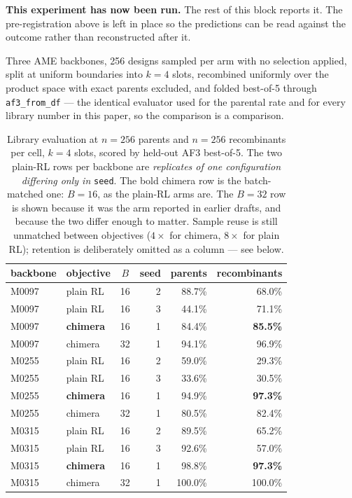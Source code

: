 \textbf{This experiment has now been run.} The rest of this block reports it.
The pre-registration above is left in place so the predictions can be read
against the outcome rather than reconstructed after it.

Three AME backbones, 256 designs sampled per arm with no selection applied,
split at uniform boundaries into $k=4$ slots, recombined uniformly over the
product space with exact parents excluded, and folded best-of-5 through
\texttt{af3\_from\_df} --- the identical evaluator used for the parental rate
and for every library number in this paper, so the comparison is a comparison.

\begin{table}[h]\centering\small
\caption{Library evaluation at $n=256$ parents and $n=256$ recombinants per
cell, $k=4$ slots, scored by held-out AF3 best-of-5. The two plain-RL rows per
backbone are \emph{replicates of one configuration differing only in}
\texttt{seed}. The bold chimera row is the batch-matched one: $B=16$, as the
plain-RL arms are. The $B=32$ row is shown because it was the arm reported in
earlier drafts, and because the two differ enough to matter. Sample reuse is
still unmatched between objectives ($4\times$ for chimera, $8\times$ for plain
RL); retention is deliberately omitted as a column --- see below.}
\label{tab:frag-retention}
\begin{tabular}{llcrrr}
\toprule
backbone & objective & $B$ & seed & parents & recombinants \\
\midrule
M0097 & plain RL          & 16 & 2 & 88.7\%  & 68.0\%  \\
M0097 & plain RL          & 16 & 3 & 44.1\%  & 71.1\%  \\
M0097 & \textbf{chimera}  & 16 & 1 & 84.4\%  & \textbf{85.5\%} \\
M0097 & chimera           & 32 & 1 & 94.1\%  & 96.9\%  \\
\midrule
M0255 & plain RL          & 16 & 2 & 59.0\%  & 29.3\%  \\
M0255 & plain RL          & 16 & 3 & 33.6\%  & 30.5\%  \\
M0255 & \textbf{chimera}  & 16 & 1 & 94.9\%  & \textbf{97.3\%} \\
M0255 & chimera           & 32 & 1 & 80.5\%  & 82.4\%  \\
\midrule
M0315 & plain RL          & 16 & 2 & 89.5\%  & 65.2\%  \\
M0315 & plain RL          & 16 & 3 & 92.6\%  & 57.0\%  \\
M0315 & \textbf{chimera}  & 16 & 1 & 98.8\%  & \textbf{97.3\%} \\
M0315 & chimera           & 32 & 1 & 100.0\% & 100.0\% \\
\bottomrule
\end{tabular}
\end{table}

